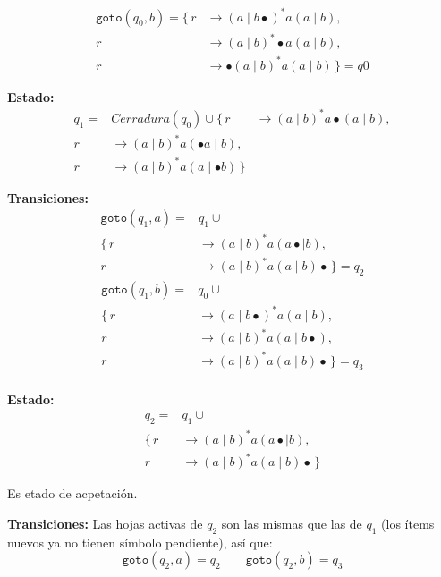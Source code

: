 \documentclass[12pt,letterpaper]{article}
\begin{document}
\begin{enumerate}[label=\arabic*.]
\begin{enumerate}
    \[
    \begin{aligned}
      \texttt{goto}(q_0, b) =
      \{\,
      r &\to(a\mid b\bullet)^*a(a\mid b),\\
      r &\to(a\mid b)^*\bullet a(a\mid b),\\
      r &\to\bullet(a\mid b)^* a(a\mid b)
      \,\} = \boxed{q0}
    \end{aligned}
    \]
    
    \medskip
  
  \textbf{Estado:}
  \[
  \begin{aligned}
    q_1 = &Cerradura(q_0) \cup
    \{\,
    r &\to(a\mid b)^*a\bullet(a\mid b),\\
    r &\to(a\mid b)^*a(\bullet a\mid b),\\
    r &\to(a\mid b)^*a(a\mid \bullet b)
    \,\}
  \end{aligned}
  \]

  \textbf{Transiciones:}
  \[
  \begin{aligned}
    \texttt{goto}(q_1, a) = &q_1 \cup\\
    \{\,
    r &\to(a\mid b)^*a(a\bullet\mid b),\\
    r &\to(a\mid b)^*a(a\mid b)\bullet
    \,\} = \boxed{q_2}
  \end{aligned}
  \]
  \[
  \begin{aligned}
    \texttt{goto}(q_1, b) = &q_0 \cup\\
    \{\,
    r &\to(a\mid b\bullet)^*a(a\mid b),\\
    r &\to(a\mid b)^*a(a\mid b\bullet),\\
    r &\to(a\mid b)^*a(a\mid b)\bullet
    \,\} = \boxed{q_3}\\
  \end{aligned}
  \]

  \medskip
  
  \textbf{Estado:}
  \[
  \begin{aligned}
    q_2 = &q_1 \cup\\
    \{\,
    r &\to(a\mid b)^*a(a\bullet\mid b),\\
    r &\to(a\mid b)^*a(a\mid b)\bullet
    \,\}
  \end{aligned}
  \]

  Es etado de acpetación.
  
  \bigskip
  
  \textbf{Transiciones:} Las hojas activas de $q_2$ son las mismas que las de $q_1$ (los ítems nuevos ya
  no tienen símbolo pendiente), así que:
  \[
  \texttt{goto}(q_2, a) = q_2
  \qquad
  \texttt{goto}(q_2, b) = q_3
  \]
  

\end{enumerate}
\end{enumerate}
\end{document}
